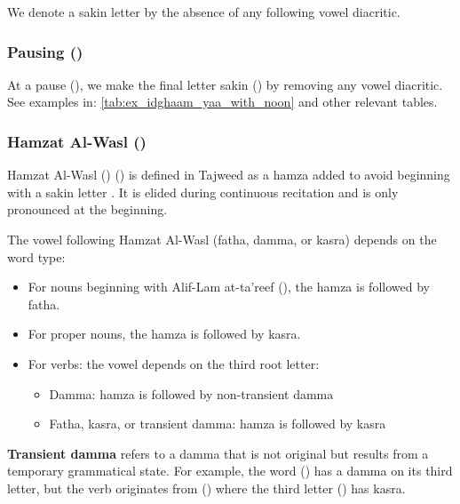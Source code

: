 We denote a sakin letter by the absence of any following vowel diacritic.

\subsubsection{Pausing ()}

At a pause (), we make the final letter sakin () by removing any vowel diacritic. See examples in: \ref{tab:ex_idghaam_yaa_with_noon} and other relevant tables.




\subsubsection{Hamzat Al-Wasl ()}

Hamzat Al-Wasl () () is defined in Tajweed as a hamza added to avoid beginning with a sakin letter \cite{sweed2021}. It is elided during continuous recitation and is only pronounced at the beginning.

The vowel following Hamzat Al-Wasl (fatha, damma, or kasra) depends on the word type:

\begin{itemize}
	\item For nouns beginning with Alif-Lam at-ta'reef (), the hamza is followed by fatha.
	\item For proper nouns, the hamza is followed by kasra.
	\item For verbs: the vowel depends on the third root letter:
	      \begin{itemize}
		      \item Damma: hamza is followed by non-transient damma
		      \item Fatha, kasra, or transient damma: hamza is followed by kasra
	      \end{itemize}
\end{itemize}

\textbf{Transient damma} refers to a damma that is not original but results from a temporary grammatical state. For example, the word () has a damma on its third letter, but the verb originates from () where the third letter () has kasra.

